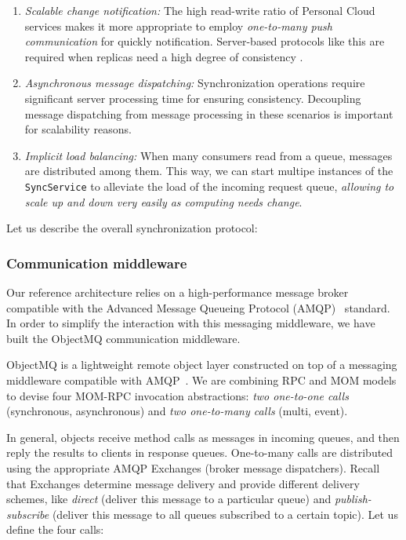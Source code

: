 \begin{enumerate}
\item \textit{Scalable change notification:} The high read-write ratio of Personal Cloud services makes
it more appropriate to employ \textit{one-to-many push communication} for quickly notification.  
Server-based protocols like this are required when replicas need a high degree of consistency \cite{Tanenbaum:2001:DSP:559404}.
\item \textit{Asynchronous message dispatching:}  Synchronization operations require significant
server processing time for ensuring consistency. Decoupling message dispatching from message
processing in these scenarios  \cite{menasce2005mom} is important for scalability reasons.
\item \textit{Implicit load balancing:} When many consumers read from a queue, messages are
distributed among them. This way, we can start multipe
instances of the \texttt{SyncService} to alleviate the load of the incoming request queue,
\textit{allowing to scale up and down very easily as computing needs change}.
\end{enumerate}

Let us describe the overall synchronization protocol:
\medskip

\subsubsection{Communication middleware}
Our reference architecture relies on a high-performance message broker compatible with the Advanced Message Queueing Protocol (AMQP)~\cite{amqp} standard. In order to simplify the interaction with this messaging middleware, we have built the ObjectMQ communication middleware. 

ObjectMQ is a lightweight remote object layer constructed on top of a messaging middleware compatible with AMQP~\cite{amqp}. 
We are combining RPC and MOM models to devise four MOM-RPC invocation abstractions: \textit{two one-to-one calls} (synchronous, 
asynchronous) and \textit{two one-to-many calls} (multi, event).

In general, objects receive method calls as messages in incoming queues, and then reply the results to clients in response queues.  
One-to-many calls are distributed using the appropriate AMQP Exchanges (broker message dispatchers). Recall that Exchanges determine
message delivery and provide different delivery schemes, like \textit{direct} (deliver this message to a particular queue) and \textit{publish-subscribe}
(deliver this message to all queues subscribed to a certain topic). Let us define the four calls:

